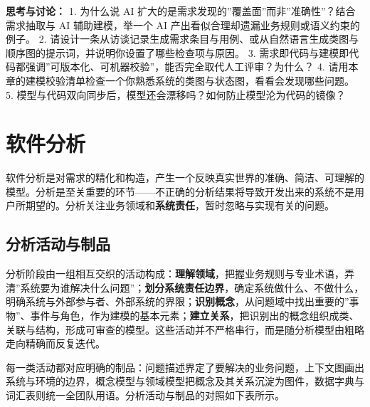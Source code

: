 \documentclass[
]{ctexbook}
\begin{document}
\textbf{思考与讨论：} 1. 为什么说 AI
扩大的是需求发现的''覆盖面''而非''准确性''？结合需求抽取与 AI
辅助建模，举一个 AI 产出看似合理却遗漏业务规则或语义约束的例子。 2.
请设计一条从访谈记录生成需求条目与用例、或从自然语言生成类图与顺序图的提示词，并说明你设置了哪些检查项与原因。
3.
需求即代码与建模即代码都强调''可版本化、可机器校验''，能否完全取代人工评审？为什么？
4.
请用本章的建模校验清单检查一个你熟悉系统的类图与状态图，看看会发现哪些问题。
5. 模型与代码双向同步后，模型还会漂移吗？如何防止模型沦为代码的镜像？

\chapter{软件分析}\label{ux8f6fux4ef6ux5206ux6790}

软件分析是对需求的精化和构造，产生一个反映真实世界的准确、简洁、可理解的模型。分析是至关重要的环节------不正确的分析结果将导致开发出来的系统不是用户所期望的。分析关注业务领域和\textbf{系统责任}，暂时忽略与实现有关的问题。

\section{分析活动与制品}\label{ux5206ux6790ux6d3bux52a8ux4e0eux5236ux54c1}

分析阶段由一组相互交织的活动构成：\textbf{理解领域}，把握业务规则与专业术语，弄清''系统要为谁解决什么问题''；\textbf{划分系统责任边界}，确定系统做什么、不做什么，明确系统与外部参与者、外部系统的界限；\textbf{识别概念}，从问题域中找出重要的''事物''、事件与角色，作为建模的基本元素；\textbf{建立关系}，把识别出的概念组织成类、关联与结构，形成可审查的模型。这些活动并不严格串行，而是随分析模型由粗略走向精确而反复迭代。

每一类活动都对应明确的制品：问题描述界定了要解决的业务问题，上下文图画出系统与环境的边界，概念模型与领域模型把概念及其关系沉淀为图件，数据字典与词汇表则统一全团队用语。分析活动与制品的对照如下表所示。
\end{document}
